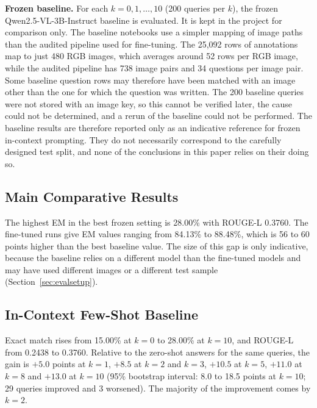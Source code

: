 \documentclass[conference]{IEEEtran}
\begin{document}
\textbf{Frozen baseline.} For each $k=0,1,\dots,10$ (200 queries per $k$), the frozen Qwen2.5-VL-3B-Instruct baseline is evaluated. It is kept in the project for comparison only. The baseline notebooks use a simpler mapping of image paths than the audited pipeline used for fine-tuning. The 25,092 rows of annotations map to just 480 RGB images, which averages around 52 rows per RGB image, while the audited pipeline has 738 image pairs and 34 questions per image pair. Some baseline question rows may therefore have been matched with an image other than the one for which the question was written. The 200 baseline queries were not stored with an image key, so this cannot be verified later, the cause could not be determined, and a rerun of the baseline could not be performed. The baseline results are therefore reported only as an indicative reference for frozen in-context prompting. They do not necessarily correspond to the carefully designed test split, and none of the conclusions in this paper relies on their doing so.

\subsection{Main Comparative Results}

The highest EM in the best frozen setting is 28.00\% with ROUGE-L 0.3760. The fine-tuned runs give EM values ranging from 84.13\% to 88.48\%, which is 56 to 60 points higher than the best baseline value. The size of this gap is only indicative, because the baseline relies on a different model than the fine-tuned models and may have used different images or a different test sample (Section~\ref{sec:evalsetup}).

\subsection{In-Context Few-Shot Baseline}\label{sec:fewshot}

Exact match rises from 15.00\% at $k=0$ to 28.00\% at $k=10$, and ROUGE-L from 0.2438 to 0.3760. Relative to the zero-shot answers for the same queries, the gain is $+5.0$ points at $k=1$, $+8.5$ at $k=2$ and $k=3$, $+10.5$ at $k=5$, $+11.0$ at $k=8$ and $+13.0$ at $k=10$ (95\% bootstrap interval: 8.0 to 18.5 points at $k=10$; 29 queries improved and 3 worsened). The majority of the improvement comes by $k=2$.
\end{document}
